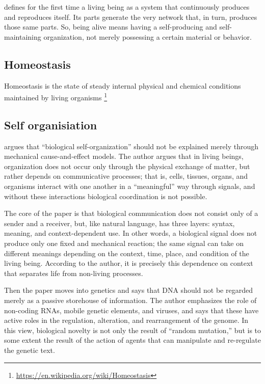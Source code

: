 \documentclass{book}
\providecommand{\seeherefooter}[1]{\footnote{\url{#1}}}
\begin{document}
    \cite{maturana-varela-1980-autopoiesis-and-cognition-the-realization-of-the-living}
    defines for the first time a living being as a system that continuously produces and reproduces itself. Its parts generate the very network that, in turn, produces those same parts.
    So, being alive means having a self-producing and self-maintaining organization, not merely possessing a certain material or behavior.

\subsection{Homeostasis}


Homeostasis is the state of steady internal physical and chemical conditions maintained by living organisms
    \seeherefooter{https://en.wikipedia.org/wiki/Homeostasis}

\subsection{Self organisiation}


\cite{witzany-2014-biological-self-organization} argues that “biological self-organization” should not be explained merely through mechanical cause-and-effect models. The author argues that in living beings, organization does not occur only through the physical exchange of matter, but rather depends on communicative processes; that is, cells, tissues, organs, and organisms interact with one another in a “meaningful” way through signals, and without these interactions biological coordination is not possible.
    
    The core of the paper is that biological communication does not consist only of a sender and a receiver, but, like natural language, has three layers: syntax, meaning, and context-dependent use. In other words, a biological signal does not produce only one fixed and mechanical reaction; the same signal can take on different meanings depending on the context, time, place, and condition of the living being. According to the author, it is precisely this dependence on context that separates life from non-living processes.
    
    Then the paper moves into genetics and says that DNA should not be regarded merely as a passive storehouse of information. The author emphasizes the role of non-coding RNAs, mobile genetic elements, and viruses, and says that these have active roles in the regulation, alteration, and rearrangement of the genome. In this view, biological novelty is not only the result of “random mutation,” but is to some extent the result of the action of agents that can manipulate and re-regulate the genetic text.
    
\end{document}

